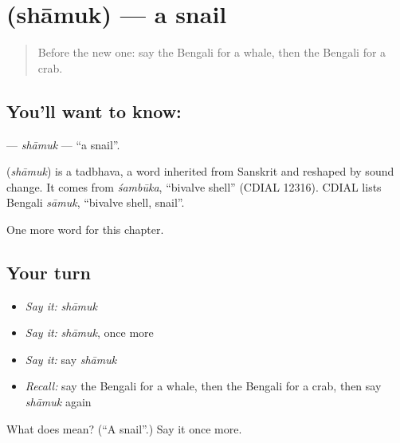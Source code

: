 \section[\texorpdfstring{\bn{শামুক} (shāmuk)}{শামুক (shāmuk)}]{ (shāmuk) — a snail}

\label{lesson:BN-C166-shamuk}



\begin{quote}
Before the new one: say the Bengali for a whale, then the Bengali for a crab.
\end{quote}

\subsection*{You'll want to know: }
\textbf{} — \emph{shāmuk} — \textquotedblleft{}a snail\textquotedblright{}.

\begin{cousinweb}
\textbf{} (\emph{shāmuk}) is a tadbhava, a word inherited from Sanskrit and reshaped by sound change. It comes from \emph{śambūka}, \textquotedblleft{}bivalve shell\textquotedblright{} (CDIAL 12316). CDIAL lists Bengali \emph{sāmuk}, \textquotedblleft{}bivalve shell, snail\textquotedblright{}.
\end{cousinweb}

\begin{grammarlens}[title={What you've built}]
One more word for this chapter.
\end{grammarlens}

\subsection*{Your turn}
\begin{itemize}
\raggedright
  \item \emph{Say it:} \emph{shāmuk}
  \item \emph{Say it:} \emph{shāmuk}, once more
  \item \emph{Say it:} say \emph{shāmuk}
  \item \emph{Recall:} say the Bengali for a whale, then the Bengali for a crab, then say \emph{shāmuk} again
\end{itemize}

\begin{tcolorbox}[breakable,colback=teal!4,colframe=teal!35!black,title={Before you move on}]
What does  mean? (\textquotedblleft{}A snail\textquotedblright{}.) Say it once more.
\end{tcolorbox}
